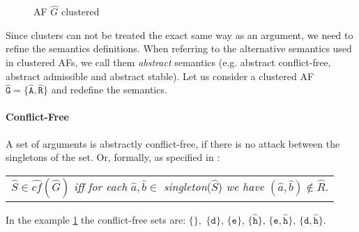\begin{figure}[h]
    \centering
    \caption{\ac{AF} $\hat{G}$ clustered}
    \label{af:backgroundExampleClusterSpurious}
\end{figure}


Since clusters can not be treated the exact same way as an argument, we need to refine the semantics definitions. When referring to the alternative semantics used in clustered AFs, we call them \emph{abstract} semantics (e.g. abstract conflict-free, abstract admissible and abstract stable). Let us consider a clustered AF $\mathtt{\hat{G}=\{\hat{A}, \hat{R}\}}$ and redefine the semantics.

\paragraph{Conflict-Free} A set of arguments is abstractly conflict-free, if there is no attack between the singletons of the set. Or, formally, as specified in \cite{DBLP:conf/kr/SaribaturW21}:

\begin{center}
    \begin{tabular}{c}
        $\hat{S} \in \hat{cf}(\hat{G})$ \textit{iff for each} $\hat{a}, \hat{b} \in$ \textit{singleton}($\hat{S}$) \textit{we have} $(\hat{a}, \hat{b}) \not\in \hat{R}$.
    \end{tabular}
\end{center}

In the example \cref{af:backgroundExampleClusterSpurious} the conflict-free sets are:
$\mathtt{\{\}},$
$\mathtt{\{d}\}$,
$\mathtt{\{e}\}$,
$\mathtt{\{\hat{h}}\}$,
$\mathtt{\{e, \hat{h}}\}$,
$\mathtt{\{d, \hat{h}}\}$.




